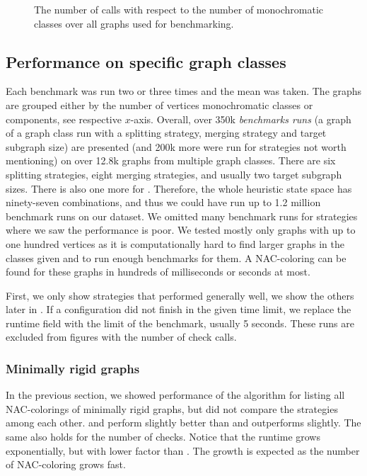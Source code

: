 \begin{figure}[ht]
	\centering
	\scalebox{\BenchFigureScale}{}
	\caption[The number of \IsNACColoring{} calls]{
		The number of \IsNACColoring{} calls with respect to the number of monochromatic classes
		over all graphs used for benchmarking.}%
	\label{fig:graph_summary}
\end{figure}%



\subsection{Performance on specific graph classes}%
\label{sec:bench_graph_classes}

Each benchmark was run two or three times and the mean was taken.
The graphs are grouped either by the number of vertices
monochromatic classes or \trcon{} components, see respective \(x\)-axis.
Overall, over 350k \emph{benchmarks runs}
(a graph of a graph class run with a splitting strategy, merging strategy
and target subgraph size)
are presented (and 200k more were run for strategies not worth mentioning)
on over 12.8k graphs from multiple graph classes.
%
There are six splitting strategies, eight merging strategies, and usually two target subgraph sizes.
There is also one more for \NaiveCycles{}.
Therefore, the whole heuristic state space has ninety-seven combinations,
and thus we could have run up to 1.2 million benchmark runs on our dataset.
We omitted many benchmark runs for strategies where we saw the  performance is poor.
%
We tested mostly only graphs with up to one hundred vertices
as it is computationally hard to find larger graphs in the classes given
and to run enough benchmarks for them.
A NAC-coloring can be found for these graphs
in hundreds of milliseconds or seconds at most.

First, we only show strategies that performed generally well,
we show the others later in .
If a configuration did not finish in the given time limit,
we replace the runtime field with the limit of the benchmark, usually 5 seconds.
These runs are excluded from figures with the number of check calls.


\subsubsection*{Minimally rigid graphs}

In the previous section, we showed performance of the algorithm for listing
all NAC-colorings of minimally rigid graphs,
but did not compare the strategies among each other.
%
\Neighbors{} and \NeighborsDegree{} perform slightly better than \None{} and
\SharedVertices{} outperforms \MergeLinear{} slightly.
The same also holds for the number of \IsNACColoring{} checks.
Notice that the runtime grows exponentially, but with lower factor than \NaiveCycles{}.
The growth is expected as the number of NAC-coloring grows fast.

